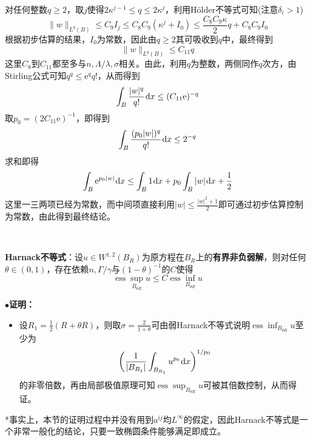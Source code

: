 \documentclass[a4paper,UTF8,fontset=windows,AutoFakeBold]{ctexart}
\newcommand*{\er}{\mathrm{e}}
\newcommand*{\dr}{\hspace{0.07em}\mathrm{d}}
\DeclareMathOperator*{\ess}{ess}
\newcommand{\proo}[1]{{\kaishu $\bullet$\textbf{证明：}
\begin{itemize}
    \item[] #1
\end{itemize}
}}
\begin{document}
{    对任何整数$q\ge2$，取$j$使得$2\kappa^{j-1}\le q\le 2\kappa^j$，利用H\"older不等式可知(注意$\delta_i>1$)
    $$\|w\|_{L^q(B)}\le C_9I_j\le C_8C_9(\kappa^j+I_0)\le\frac{C_8C_9\kappa}{2}q+C_8C_9I_0$$
    根据初步估算的结果，$I_0$为常数，因此由$q\ge2$其可吸收到$q$中，最终得到
    $$\|w\|_{L^q(B)}\le C_{11}q$$
    这里$C_8$到$C_{11}$都至多与$n,\Lambda/\lambda,\sigma$相关。由此，利用$q$为整数，两侧同作$q$次方，由Stirling公式可知$q^q\le\er^qq!$，从而得到
    $$\int_B\frac{|w|^q}{q!}\dr x\le(C_{11}\er)^{-q}$$
    取$p_0=(2C_{11}\er)^{-1}$，即得到
    $$\int_B\frac{(p_0|w|)^q}{q!}\dr x\le2^{-q}$$
    求和即得
    $$\int_B\er^{p_0|w|}\dr x\le\int_B1\dr x+p_0\int_B|w|\dr x+\frac{1}{2}$$
    这里一三两项已经为常数，而中间项直接利用$|w|\le\frac{|w|^2+1}{2}$即可通过初步估算控制为常数，由此得到最终结论。
}

\

\textbf{Harnack不等式}：设$u\in W^{1,2}(B_R)$为原方程在$B_R$上的\textbf{有界非负弱解}，则对任何$\theta\in(0,1)$，存在依赖$n,\Gamma/\gamma$与$(1-\theta)^{-1}$的$C$使得
$$\ess\sup_{B_{\theta R}}u\le C\ess\inf_{B_{\theta R}}u$$
\proo{
    设$R_1=\frac{1}{2}(R+\theta R)$，则取$\sigma=\frac{2}{1+\theta}$可由弱Harnack不等式说明$\ess\inf_{B_{\theta R}}u$至少为
    $$\bigg(\frac{1}{|B_{R_1}|}\int_{B_{R_1}}u^{p_0}\dr x\bigg)^{1/p_0}$$
    的非零倍数，再由局部极值原理可知$\ess\sup_{B_{\theta R}}u$可被其倍数控制，从而得证。
}

*事实上，本节的证明过程中并没有用到$a^{ij}$均$L^\infty$的假定，因此Harnack不等式是一个非常一般化的结论，只要一致椭圆条件能够满足即成立。
\end{document}
